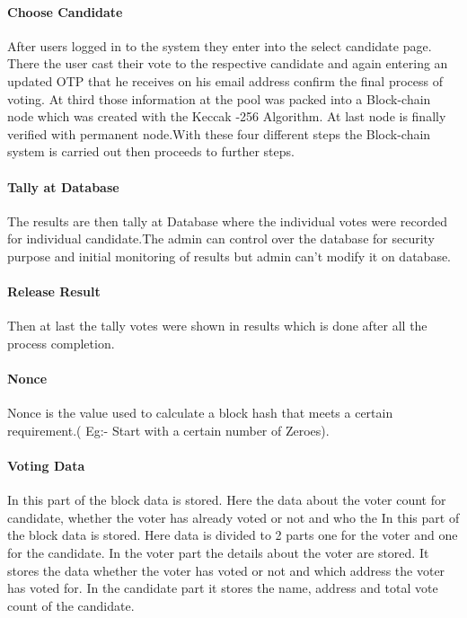 \documentclass[a4paper,12pt]{report}
\begin{document}
\paragraph{Choose Candidate}
After users logged in to the system they enter into the select candidate page. There the user cast their vote to the respective candidate and again entering an updated OTP that he receives on his email address confirm the final process of voting. At third those information at the pool was packed into a Block-chain node which was created with the Keccak -256 Algorithm. At last node is finally verified with permanent node.With these four different steps the Block-chain system is carried out then proceeds to further steps.

\paragraph{Tally at Database}
The results are then tally at Database where the individual votes were recorded for individual candidate.The admin can control over the database for security purpose and initial monitoring of results but admin can't modify it on database.

\paragraph{Release Result}
Then at last the tally votes were shown in results which is done after all the process completion.

\paragraph{Nonce}
Nonce is the value used to calculate a block hash that meets a certain requirement.( Eg:- Start with a certain number of Zeroes).

\paragraph{Voting Data}
In this part of the block data is stored. Here the data about the voter count for candidate, whether the voter has already voted or not  and who the 
In this part of the block data is stored. Here data is divided to 2 parts one for the voter and one for the candidate. In the voter part the details about the voter are stored. It stores the data whether the voter has voted or not and which address the voter has voted for. In the candidate part it stores the name, address and total vote count of the candidate.
\end{document}
